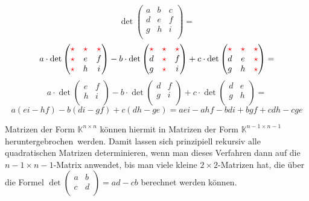 \documentclass{scrartcl}
\newcommand{\mystar}{{\textcolor{red}{\fontfamily{lmr}\selectfont\ensuremath{\star}}}}
\begin{document}
\begin{equation}
	\det\begin{pmatrix*}
		a & b & c \\
		d & e & f \\
		g & h & i \\
	\end{pmatrix*} =
\end{equation}
\begin{equation}
	a \cdot \det\begin{pmatrix*}
		\mystar & \mystar & \mystar \\
		\mystar & e	  & f \\
		\mystar & h       & i \\
	\end{pmatrix*} - b \cdot \det\begin{pmatrix*}
		\mystar & \mystar & \mystar \\
		d       & \mystar & f \\
		g       & \mystar & i \\
	\end{pmatrix*} + c \cdot \det\begin{pmatrix*}
		\mystar & \mystar & \mystar \\
		d       & e       & \mystar \\
		g       & h       & \mystar \\
	\end{pmatrix*} = 
\end{equation}
\begin{equation}
	a\cdot \det\begin{pmatrix*}
		e & f \\
		h & i \\
	\end{pmatrix*} - b\cdot \det\begin{pmatrix*}
		d & f \\
		g & i \\
	\end{pmatrix*} + c\cdot \det\begin{pmatrix*}
		d & e \\
		g & h \\
	\end{pmatrix*} =
\end{equation}
\begin{equation}
	a(ei - hf) - b(di - gf) + c(dh - ge) = 
	aei - ahf  - bdi + bgf  + cdh - cge
\end{equation}

Matrizen der Form $\mathbb{K}^{n\times n}$ können hiermit in Matrizen der Form $\mathbb{K}^{n - 1 \times n - 1}$ \frq heruntergebrochen\flq\ werden. 
Damit lassen sich prinzipiell rekursiv alle quadratischen Matrizen determinieren, wenn man dieses Verfahren dann auf die 
$n - 1 \times n - 1$-Matrix anwendet, bis man viele kleine $2 \times 2$-Matrizen hat, die über die Formel
$\det\begin{pmatrix*}
	a & b \\
	c & d \\
\end{pmatrix*} = ad - cb$ berechnet werden können.
\end{document}
